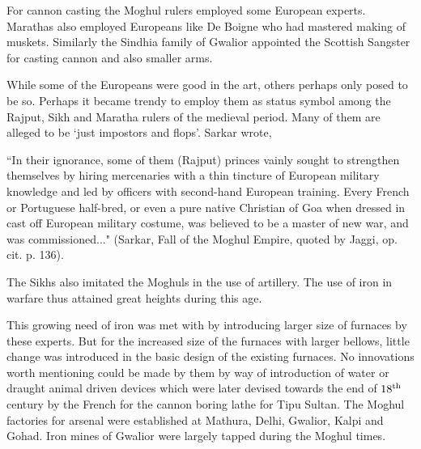 For cannon casting the Moghul rulers employed some European experts. Marathas also employed Europeans like De Boigne who had mastered making of muskets. Similarly the Sindhia family of Gwalior appointed the Scottish Sangster for casting cannon and also smaller arms.

While some of the Europeans were good in the art, others perhaps only posed to be so.  Perhaps it became trendy to employ them as status symbol among the Rajput, Sikh and Maratha rulers of the medieval period. Many of them are alleged to be `just impostors and flops'. Sarkar wrote, 

{\footnotesize{``In their ignorance, some of them (Rajput) princes vainly sought to strengthen themselves by hiring mercenaries with a thin tincture of European military knowledge and led by officers with second-hand European training. Every French or Portuguese half-bred, or even a pure native Christian of Goa when dressed in cast off European military costume, was believed to be a master of new war, and was commissioned..."}} (Sarkar, Fall of the Moghul Empire, quoted by Jaggi, op. cit. p. 136).

The Sikhs also imitated the Moghuls in the use of artillery. The use of iron in warfare thus attained great heights during this age.

This growing need of iron was met with by introducing larger size of furnaces by these experts. But for the increased size of the furnaces with larger bellows, little change was introduced in the basic design of the existing furnaces. No innovations worth mentioning could be made by them by way of introduction of water or draught animal driven devices which were later devised towards the end of $18^{\rm th}$ century by the French for the cannon boring lathe for Tipu Sultan. The Moghul factories for arsenal were established at Mathura, Delhi, Gwalior, Kalpi and Gohad. Iron mines of Gwalior were largely tapped during the Moghul times. 

